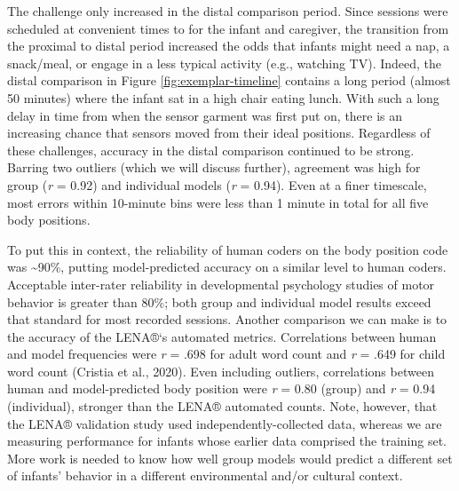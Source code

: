 \documentclass[
  man]{apa6}
\begin{document}
The challenge only increased in the distal comparison period. Since sessions were scheduled at convenient times to for the infant and caregiver, the transition from the proximal to distal period increased the odds that infants might need a nap, a snack/meal, or engage in a less typical activity (e.g., watching TV). Indeed, the distal comparison in Figure \ref{fig:exemplar-timeline} contains a long period (almost 50 minutes) where the infant sat in a high chair eating lunch. With such a long delay in time from when the sensor garment was first put on, there is an increasing chance that sensors moved from their ideal positions. Regardless of these challenges, accuracy in the distal comparison continued to be strong. Barring two outliers (which we will discuss further), agreement was high for group (\emph{r} = 0.92) and individual models (\emph{r} = 0.94). Even at a finer timescale, most errors within 10-minute bins were less than 1 minute in total for all five body positions.

To put this in context, the reliability of human coders on the body position code was \textasciitilde90\%, putting model-predicted accuracy on a similar level to human coders. Acceptable inter-rater reliability in developmental psychology studies of motor behavior is greater than 80\%; both group and individual model results exceed that standard for most recorded sessions. Another comparison we can make is to the accuracy of the LENA®`s automated metrics. Correlations between human and model frequencies were \emph{r} = .698 for adult word count and \emph{r} = .649 for child word count (Cristia et al., 2020). Even including outliers, correlations between human and model-predicted body position were \emph{r} = 0.80 (group) and \emph{r} = 0.94 (individual), stronger than the LENA® automated counts. Note, however, that the LENA® validation study used independently-collected data, whereas we are measuring performance for infants whose earlier data comprised the training set. More work is needed to know how well group models would predict a different set of infants' behavior in a different environmental and/or cultural context.
\end{document}
